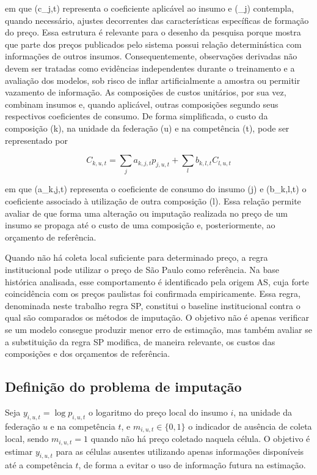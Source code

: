 em que (c_{j,t}) representa o coeficiente aplicável ao insumo e (\kappa_j) 
contempla, quando necessário, ajustes decorrentes das características específicas de 
formação do preço. Essa estrutura é relevante para o desenho da pesquisa porque mostra 
que parte dos preços publicados pelo sistema possui relação determinística com 
informações de outros insumos. Consequentemente, observações derivadas não devem ser 
tratadas como evidências independentes durante o treinamento e a avaliação dos modelos, 
sob risco de inflar artificialmente a amostra ou permitir vazamento de informação.
As composições de custos unitários, por sua vez, combinam insumos e, quando aplicável, 
outras composições segundo seus respectivos coeficientes de consumo. De forma 
simplificada, o custo da composição (k), na unidade da federação (u) e na competência 
(t), pode ser representado por

\begin{equation} C_{k,u,t} = \sum_j a_{k,j,t} p_{j,u,t} + \sum_l b_{k,l,t} C_{l,u,t} \label{eq:custo-composicao} \end{equation}

em que (a_{k,j,t}) representa o coeficiente de consumo do insumo (j) e (b_{k,l,t}) 
o coeficiente associado à utilização de outra composição (l). Essa relação permite 
avaliar de que forma uma alteração ou imputação realizada no preço de um insumo se 
propaga até o custo de uma composição e, posteriormente, ao orçamento de referência.

Quando não há coleta local suficiente para determinado preço, a regra institucional 
pode utilizar o preço de São Paulo como referência. Na base histórica analisada, esse 
comportamento é identificado pela origem AS, cuja forte coincidência com os preços 
paulistas foi confirmada empiricamente. Essa regra, denominada neste trabalho regra SP, 
constitui o baseline institucional contra o qual são comparados os métodos de imputação. 
O objetivo não é apenas verificar se um modelo consegue produzir menor erro de estimação, 
mas também avaliar se a substituição da regra SP modifica, de maneira relevante, os 
custos das composições e dos orçamentos de referência.


\subsection{Definição do problema de imputação}

Seja \(y_{i,u,t}=\log p_{i,u,t}\) o logaritmo do preço local do insumo \(i\), 
na unidade da federação \(u\) e na competência \(t\), e \(m_{i,u,t}\in\{0,1\}\) o 
indicador de ausência de coleta local, sendo \(m_{i,u,t}=1\) quando não há preço 
coletado naquela célula. O objetivo é estimar \(y_{i,u,t}\) para as células ausentes 
utilizando apenas informações disponíveis até a competência \(t\), de forma a evitar 
o uso de informação futura na estimação.

